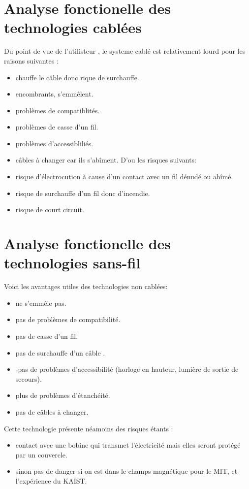 \documentclass[12pt]{report}
\begin{document}
\section{Analyse fonctionelle des technologies cablées}
	Du point de vue de l'utilisteur , le systeme cablé est relativement lourd pour les raisons suivantes :
\begin{itemize}
	\item chauffe le câble donc rique de surchauffe.
	\item encombrants, s'emmêlent.
	\item problèmes de compatiblités.
	\item problèmes de casse d'un fil.
	\item problèmes d'accessibliliés.
	\item câbles à changer car ils s'abîment.
	D'ou les risques suivants:
	\item risque d'électrocution à cause d'un contact avec un fil dénudé ou abîmé.
	\item risque de surchauffe d'un fil donc d'incendie.
	\item risque de court circuit.
\end{itemize}
\section{Analyse fonctionelle des technologies sans-fil}
Voici les avantages utiles des technologies non cablées:
\begin{itemize}
	\item ne s'emmêle pas.
	\item pas de problèmes de compatibilité.
	\item pas de casse d'un fil.
	\item pas de surchauffe d'un câble .
	\item -pas de problèmes d'accessibilité (horloge en hauteur, lumière de sortie de secours).
	\item plus de problèmes d'étanchéité.
	\item pas de câbles à changer.
\end{itemize}
Cette technologie présente néamoins des risques étants :
\begin{itemize}
	\item contact avec une bobine qui transmet l'électricité mais elles seront protégé par un couvercle.
	\item sinon pas de danger si on est dans le champs magnétique pour le MIT, et l'expérience du KAIST.
\end{itemize}
\end{document}

